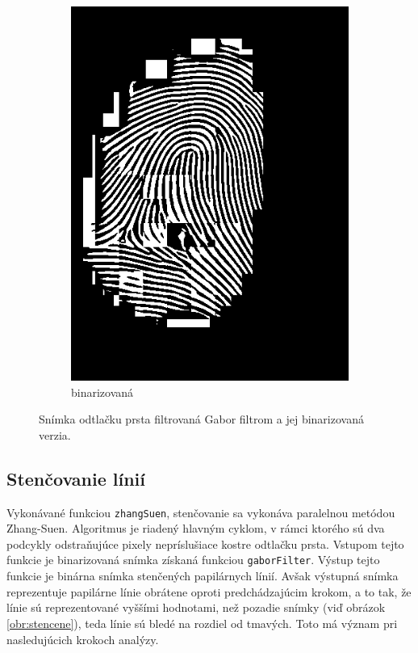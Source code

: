 \begin{figure}[h]
\begin{subfigure}[b]{0.3\linewidth}
      \includegraphics[width=\linewidth]{obrazky-figures/gabor_filtered_binarized.png}
      \caption{binarizovaná}
    \end{subfigure}
    \caption{Snímka odtlačku prsta filtrovaná Gabor filtrom a jej binarizovaná verzia.}
    \label{obr:gabor}
  \end{figure}

  \subsection{Stenčovanie línií}
  Vykonávané funkciou \texttt{zhangSuen}, stenčovanie sa vykonáva paralelnou metódou Zhang-Suen. Algoritmus je riadený hlavným cyklom, v rámci ktorého sú
  dva podcykly odstraňujúce pixely nepríslušiace kostre odtlačku prsta. Vstupom tejto funkcie je binarizovaná snímka získaná funkciou \texttt{gaborFilter}.
  Výstup tejto funkcie je binárna snímka stenčených papilárnych línií. Avšak výstupná snímka reprezentuje papilárne línie obrátene oproti predchádzajúcim
  krokom, a to tak, že línie sú reprezentované vyššími hodnotami, než pozadie snímky (viď obrázok \ref{obr:stencene}), teda línie sú bledé na rozdiel od
  tmavých. Toto má význam pri nasledujúcich krokoch analýzy.

